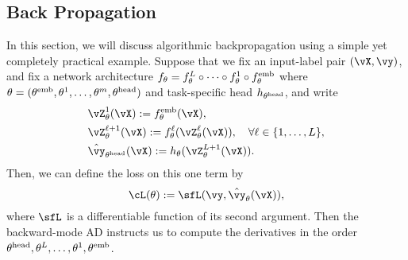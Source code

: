 \documentclass[../../book-main.tex]{subfiles}
\begin{document}
\subsection{Back Propagation}
\label{app:BP-section}
In this section, we will discuss algorithmic backpropagation using a simple yet completely practical example. Suppose that we fix an input-label pair \((\vX, \vy)\), and fix a network architecture \(f_{\theta} = f_{\theta}^{L} \circ \cdots \circ f_{\theta}^{1} \circ f_{\theta}^{\mathrm{emb}}\) where \(\theta = (\theta^{\mathrm{emb}}, \theta^{1}, \dots, \theta^{m}, \theta^{\mathrm{head}})\) and task-specific head \(h_{\theta^{\mathrm{head}}}\), and write
\begin{align}
    &\vZ_{\theta}^{1}(\vX) := f_{\theta}^{\emb}(\vX), \\ 
    &\vZ_{\theta}^{\ell + 1}(\vX) := f_{\theta}^{\ell}(\vZ_{\theta}^{\ell}(\vX)), \quad \forall \ell \in \{1, \dots, L\}, \\
    &\hat{\vy}_{\theta^{\head}}(\vX) := h_{\theta}(\vZ_{\theta}^{L+1}(\vX)).
\end{align}
Then, we can define the loss on this one term by 
\begin{equation}
    \cL(\theta) := \sfL(\vy, \hat{\vy}_{\theta}(\vX)),
\end{equation}
where \(\sfL\) is a differentiable function of its second argument. Then the backward-mode AD instructs us to compute the derivatives in the order \(\theta^{\mathrm{head}}, \theta^{L}, \dots, \theta^{1}, \theta^{\mathrm{emb}}\). 
\end{document}
